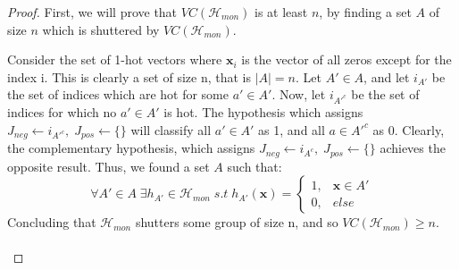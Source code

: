 \subsubsection{}
\begin{proof}
    First, we will prove that $VC(\mathcal{H}_{mon})$ is at least $n$, by finding a set $A$ of size $n$ which is shuttered by $VC(\mathcal{H}_{mon})$.
    
    Consider the set of 1-hot vectors where $\boldsymbol{x}_i$ is the vector of all zeros except for the index i.
    This is clearly a set of size n, that is $|A|=n$.
    Let $A' \in A$, and let $i_{A'}$ be the set of indices which are hot for some $a' \in A'$.
    Now, let $i_{A'^c}$ be the set of indices for which no $a' \in A'$ is hot.
    The hypothesis which assigns $J_{neg} \gets i_{A'^c}, \; J_{pos} \gets \{\}$ will classify all $a' \in A'$ as 1, and all $a \in A'^c$ as 0. Clearly, the complementary hypothesis, which assigns $J_{neg} \gets i_{A^c}, \; J_{pos} \gets \{\}$ achieves the opposite result. Thus, we found a set $A$ such that:
    \begin{equation*}
        \forall A' \in A \; \exists h_{A'} \in \mathcal{H}_{mon} \; s.t \; h_{A'}(\boldsymbol{x}) = 
        \begin{cases}
            1, & \boldsymbol{x} \in A' \\
            0, & else
        \end{cases}
    \end{equation*}
    Concluding that $\mathcal{H}_{mon}$ shutters some group of size n, and so $VC(\mathcal{H}_{mon}) \geq n$. \\\\
    

\end{proof}
